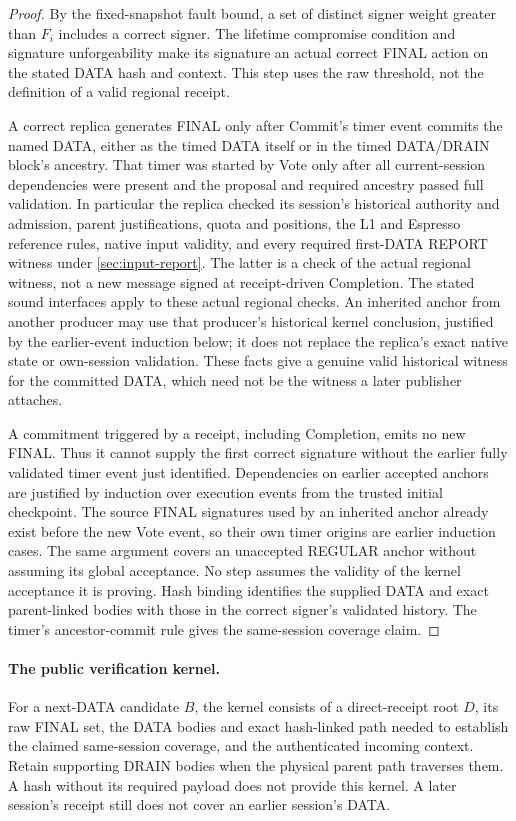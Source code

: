 \begin{proof}
By the fixed-snapshot fault bound, a set of distinct signer weight
greater than $F_i$ includes a correct signer. The lifetime compromise
condition and signature unforgeability make its signature an actual
correct FINAL action on the stated DATA hash and context. This step
uses the raw threshold, not the definition of a valid regional receipt.

A correct replica generates FINAL only after Commit's timer event
commits the named DATA, either as the timed DATA itself or in the timed
DATA/DRAIN block's ancestry. That timer was started by Vote only after
all current-session dependencies were present and the proposal and
required ancestry passed full validation. In particular the replica
checked its session's historical authority and admission, parent
justifications, quota and positions, the L1 and Espresso reference
rules, native input validity, and every required first-DATA REPORT
witness under \cref{sec:input-report}. The latter is a check of the actual
regional witness, not a new message signed at receipt-driven Completion.
The stated sound interfaces apply to
these actual regional checks. An inherited anchor from another producer
may use that producer's historical kernel conclusion, justified by the
earlier-event induction below; it does not replace the replica's exact
native state or own-session validation. These facts give a genuine valid
historical witness for the committed DATA, which need not be the witness
a later publisher attaches.

A commitment triggered by a receipt, including Completion, emits no
new FINAL. Thus it cannot supply the first correct signature without
the earlier fully validated timer event just identified. Dependencies
on earlier accepted anchors are justified by induction over execution
events from the trusted initial checkpoint. The source FINAL signatures
used by an inherited anchor already exist before the new Vote event,
so their own timer origins are earlier induction cases. The same
argument covers an unaccepted REGULAR anchor without assuming its
global acceptance. No step assumes the validity of the kernel acceptance
it is proving. Hash binding identifies the
supplied DATA and exact parent-linked bodies with those in the correct
signer's validated history. The timer's ancestor-commit rule gives the
same-session coverage claim.
\end{proof}

\paragraph{The public verification kernel.}
For a next-DATA candidate $B$, the kernel consists of a direct-receipt
root $D$, its raw FINAL set, the DATA bodies and exact hash-linked path
needed to establish the claimed same-session coverage, and the
authenticated incoming context. Retain supporting DRAIN bodies when
the physical parent path traverses them. A hash without its required
payload does not provide this kernel. A later session's receipt still
does not cover an earlier session's DATA.

